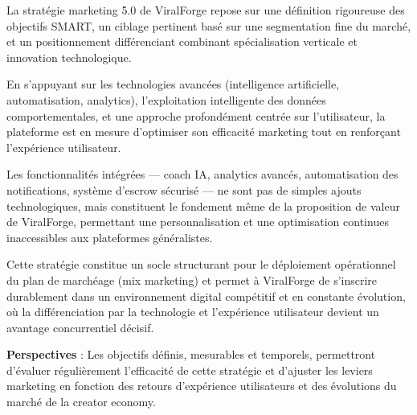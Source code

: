 La stratégie marketing 5.0 de ViralForge repose sur une définition rigoureuse des objectifs SMART, un ciblage pertinent basé sur une segmentation fine du marché, et un positionnement différenciant combinant spécialisation verticale et innovation technologique.

En s'appuyant sur les technologies avancées (intelligence artificielle, automatisation, analytics), l'exploitation intelligente des données comportementales, et une approche profondément centrée sur l'utilisateur, la plateforme est en mesure d'optimiser son efficacité marketing tout en renforçant l'expérience utilisateur.

Les fonctionnalités intégrées — coach IA, analytics avancés, automatisation des notifications, système d'escrow sécurisé — ne sont pas de simples ajouts technologiques, mais constituent le fondement même de la proposition de valeur de ViralForge, permettant une personnalisation et une optimisation continues inaccessibles aux plateformes généralistes.

Cette stratégie constitue un socle structurant pour le déploiement opérationnel du plan de marchéage (mix marketing) et permet à ViralForge de s'inscrire durablement dans un environnement digital compétitif et en constante évolution, où la différenciation par la technologie et l'expérience utilisateur devient un avantage concurrentiel décisif.

\vspace{0.5cm}

\textbf{Perspectives} : Les objectifs définis, mesurables et temporels, permettront d'évaluer régulièrement l'efficacité de cette stratégie et d'ajuster les leviers marketing en fonction des retours d'expérience utilisateurs et des évolutions du marché de la creator economy.


